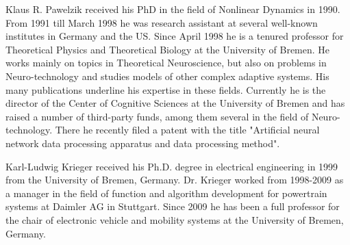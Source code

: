 \begin{IEEEbiography}{Klaus R. Pawelzik}
	received his PhD in the field of Nonlinear Dynamics in
	1990.  From 1991 till March 1998 he was research assistant at several
	well-known institutes in Germany and the US. Since April 1998 he is a
	tenured professor for Theoretical Physics and Theoretical Biology at the
	University of Bremen. He works mainly on topics in Theoretical
	Neuroscience, but also on problems in Neuro-technology and studies
	models of other complex adaptive systems. His many publications
	underline his expertise in these fields. Currently he is the director of
	the Center of Cognitive Sciences at the University of Bremen and has
	raised a number of third-party funds, among them several in the field of
	Neuro-technology. There he recently filed a patent with the title
	"Artificial neural network data processing apparatus and data processing
	method".
\end{IEEEbiography}


\begin{IEEEbiography}{Karl-Ludwig Krieger} received his Ph.D. degree in electrical engineering in 1999 from the University of Bremen, Germany. Dr. Krieger worked from 1998-2009 as a manager in the field of function and algorithm development for powertrain systems at Daimler AG in Stuttgart. Since 2009 he has been a full professor for the chair of electronic vehicle and mobility systems at the University of Bremen, Germany.
\end{IEEEbiography}

